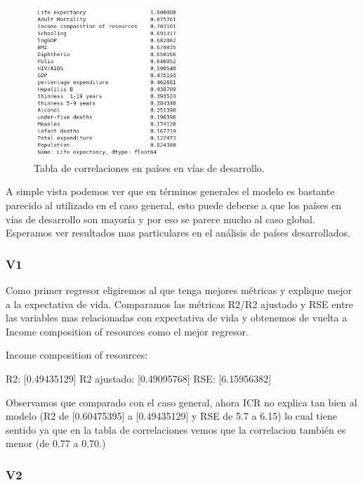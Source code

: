  \begin{figure}[H]
	\centering
	\includegraphics[width=0.5\textwidth]{img/tabla_developing.png}
	\caption{Tabla de correlaciones en países en vías de desarrollo.}
	\label{tabla_developing}
\end{figure}

A simple vista podemos ver que en términos generales el modelo es bastante parecido al utilizado en el caso general, esto puede deberse a que los países en vías de desarrollo son mayoría y por eso se parece mucho al caso global. Esperamos ver resultados mas particulares en el análisis de países desarrollados.

\subsubsection{V1}

Como primer regresor eligiremos al que tenga mejores métricas y explique mejor a la expectativa de vida. Comparamos las métricas R2/R2 ajustado y RSE entre las variables mas relacionadas con expectativa de vida y obtenemos de vuelta a Income composition of resources como el mejor regresor.

Income composition of resources:

R2: [0.49435129]
R2 ajustado: [0.49095768]
RSE: [6.15956382]

Observamos que comparado con el caso general, ahora ICR no explica tan bien al modelo (R2 de [0.60475395] a [0.49435129] y RSE de 5.7 a 6.15) lo cual tiene sentido ya que en la tabla de correlaciones vemos que la correlacion también es menor (de 0.77 a 0.70.)

\subsubsection{V2}


